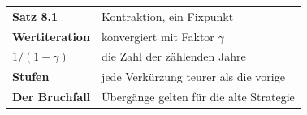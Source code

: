 \begin{merksatz}
\begin{center}
\renewcommand{\arraystretch}{1.5}
\begin{tabular}{@{}P{3.0cm}P{5.6cm}@{}}
\toprule
\textbf{Satz 8.1} & Kontraktion, ein Fixpunkt\\
\textbf{Wertiteration} & konvergiert mit Faktor $\gamma$\\
\textbf{$1/(1-\gamma)$} & die Zahl der zählenden Jahre\\
\textbf{Stufen} & jede Verkürzung teurer als die vorige\\
\textbf{Der Bruchfall} & Übergänge gelten für die alte Strategie\\
\bottomrule
\end{tabular}
\end{center}

\begin{center}
\begin{minipage}{0.88\textwidth}
\end{minipage}
\end{center}
\end{merksatz}
